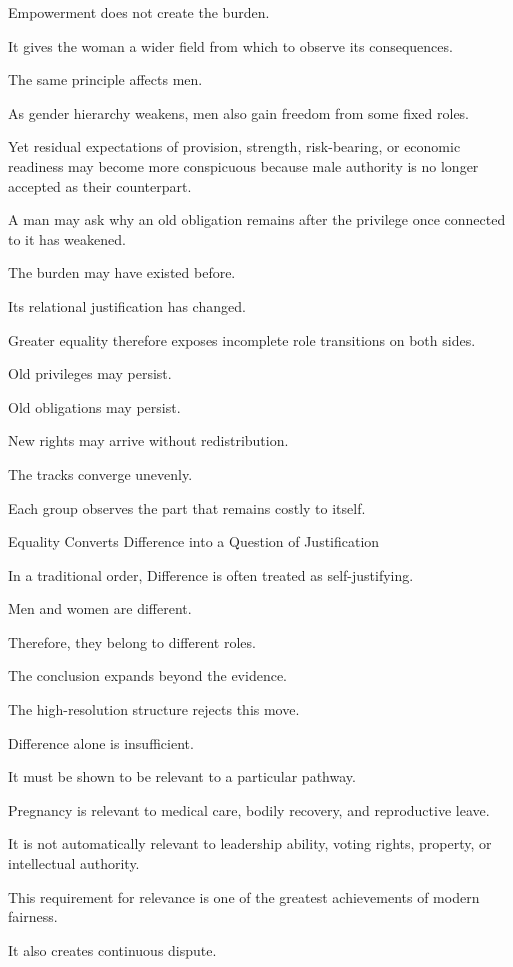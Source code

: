 Empowerment does not create the burden.

It gives the woman a wider field from which to observe its consequences.

The same principle affects men.

As gender hierarchy weakens, men also gain freedom from some fixed roles.

Yet residual expectations of provision, strength, risk-bearing, or economic readiness may become more conspicuous because male authority is no longer accepted as their counterpart.

A man may ask why an old obligation remains after the privilege once connected to it has weakened.

The burden may have existed before.

Its relational justification has changed.

Greater equality therefore exposes incomplete role transitions on both sides.

Old privileges may persist.

Old obligations may persist.

New rights may arrive without redistribution.

The tracks converge unevenly.

Each group observes the part that remains costly to itself.

Equality Converts Difference into a Question of Justification

In a traditional order, Difference is often treated as self-justifying.

Men and women are different.

Therefore, they belong to different roles.

The conclusion expands beyond the evidence.

The high-resolution structure rejects this move.

Difference alone is insufficient.

It must be shown to be relevant to a particular pathway.

Pregnancy is relevant to medical care, bodily recovery, and reproductive leave.

It is not automatically relevant to leadership ability, voting rights, property, or intellectual authority.

This requirement for relevance is one of the greatest achievements of modern fairness.

It also creates continuous dispute.

